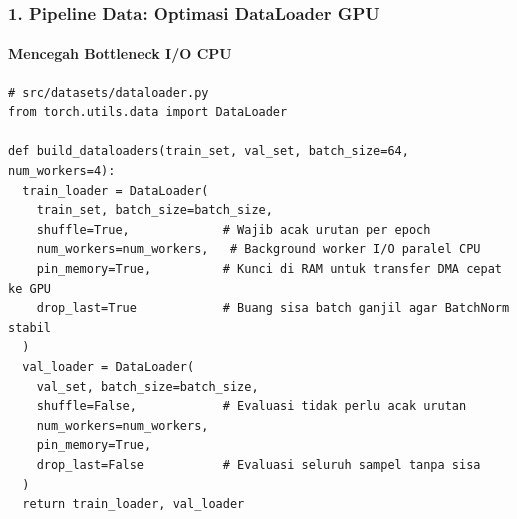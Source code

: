 \documentclass[t,aspectratio=169,xcolor=dvipsnames]{beamer}
\begin{document}
\begin{frame}[fragile]
  \frametitle{1. Pipeline Data: Optimasi DataLoader GPU}
  \framesubtitle{Mencegah Bottleneck I/O CPU}

\begin{lstlisting}[style=py]
# src/datasets/dataloader.py
from torch.utils.data import DataLoader

def build_dataloaders(train_set, val_set, batch_size=64, num_workers=4):
  train_loader = DataLoader(
    train_set, batch_size=batch_size,
    shuffle=True,             # Wajib acak urutan per epoch
    num_workers=num_workers,   # Background worker I/O paralel CPU
    pin_memory=True,          # Kunci di RAM untuk transfer DMA cepat ke GPU
    drop_last=True            # Buang sisa batch ganjil agar BatchNorm stabil
  )
  val_loader = DataLoader(
    val_set, batch_size=batch_size,
    shuffle=False,            # Evaluasi tidak perlu acak urutan
    num_workers=num_workers,
    pin_memory=True,
    drop_last=False           # Evaluasi seluruh sampel tanpa sisa
  )
  return train_loader, val_loader
\end{lstlisting}
\end{frame}
\end{document}
